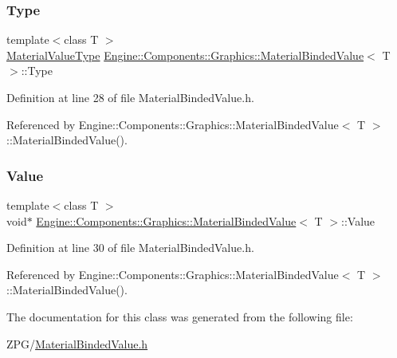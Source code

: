 \mbox{\label{classEngine_1_1Components_1_1Graphics_1_1MaterialBindedValue_acb1b73dd34f8cd4ff9d68f0ce483e372}} 
\subsubsection{\texorpdfstring{Type}{Type}}
{\footnotesize\ttfamily template$<$class T $>$ \\
\mbox{\hyperlink{namespaceEngine_1_1Components_1_1Graphics_a44f5a2b57ee82aed849896c8311e403b}{Material\+Value\+Type}} \mbox{\hyperlink{classEngine_1_1Components_1_1Graphics_1_1MaterialBindedValue}{Engine\+::\+Components\+::\+Graphics\+::\+Material\+Binded\+Value}}$<$ T $>$\+::Type}



Definition at line 28 of file Material\+Binded\+Value.\+h.



Referenced by Engine\+::\+Components\+::\+Graphics\+::\+Material\+Binded\+Value$<$ T $>$\+::\+Material\+Binded\+Value().

\mbox{\label{classEngine_1_1Components_1_1Graphics_1_1MaterialBindedValue_a954c91d9f00092782f0ed0b840d92e26}} 
\subsubsection{\texorpdfstring{Value}{Value}}
{\footnotesize\ttfamily template$<$class T $>$ \\
void$\ast$ \mbox{\hyperlink{classEngine_1_1Components_1_1Graphics_1_1MaterialBindedValue}{Engine\+::\+Components\+::\+Graphics\+::\+Material\+Binded\+Value}}$<$ T $>$\+::Value}



Definition at line 30 of file Material\+Binded\+Value.\+h.



Referenced by Engine\+::\+Components\+::\+Graphics\+::\+Material\+Binded\+Value$<$ T $>$\+::\+Material\+Binded\+Value().



The documentation for this class was generated from the following file\+:\begin{DoxyCompactItemize}
\item 
Z\+P\+G/\mbox{\hyperlink{MaterialBindedValue_8h}{Material\+Binded\+Value.\+h}}\end{DoxyCompactItemize}
